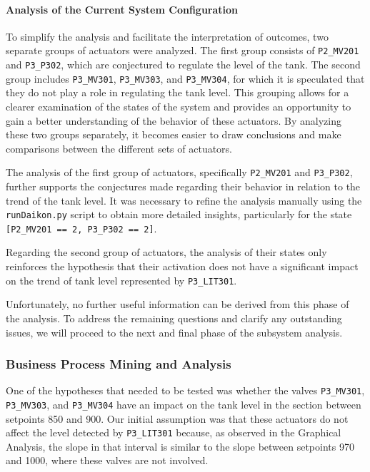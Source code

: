 \paragraph{Analysis of the Current System Configuration}
\label{par:6_P2P3_current_system_conf}
To simplify the analysis and facilitate the interpretation of outcomes, two separate groups of actuators were analyzed. The first group consists of \texttt{P2\_MV201} and \texttt{P3\_P302}, which are conjectured to regulate the level of the tank. The second group includes \texttt{P3\_MV301}, \texttt{P3\_MV303}, and \texttt{P3\_MV304}, for which it is speculated that they do not play a role in regulating the tank level. This grouping allows for a clearer examination of the states of the system and provides an opportunity to gain a better understanding of the behavior of these actuators. By analyzing these two groups separately, it becomes easier to draw conclusions and make comparisons between the different sets of actuators.

\bigskip
The analysis of the first group of actuators, specifically \texttt{P2\_MV201} and \texttt{P3\_P302}, further supports the conjectures made regarding their behavior in relation to the trend of the tank level. It was necessary to refine the analysis manually using the \texttt{runDaikon.py} script to obtain more detailed insights, particularly for the state \texttt{[P2\_MV201 == 2, P3\_P302 == 2]}. 

Regarding the second group of actuators, the analysis of their states only reinforces the hypothesis that their activation does not have a significant impact on the trend of tank level represented by \texttt{P3\_LIT301}. 

\bigskip
Unfortunately, no further useful information can be derived from this phase of the analysis. To address the remaining questions and clarify any outstanding issues, we will proceed to the next and final phase of the subsystem analysis.

\vfill

\subsubsection{Business Process Mining and Analysis}
\label{subsubsec:6_P2P3_bpa}

One of the hypotheses that needed to be tested was whether the valves \texttt{P3\_MV301}, \texttt{P3\_MV303}, and \texttt{P3\_MV304} have an impact on the tank level in the section between setpoints 850 and 900. Our initial assumption was that these actuators do not affect the level detected by \texttt{P3\_LIT301} because, as observed in the Graphical Analysis, the slope in that interval is similar to the slope between setpoints 970 and 1000, where these valves are not involved.

